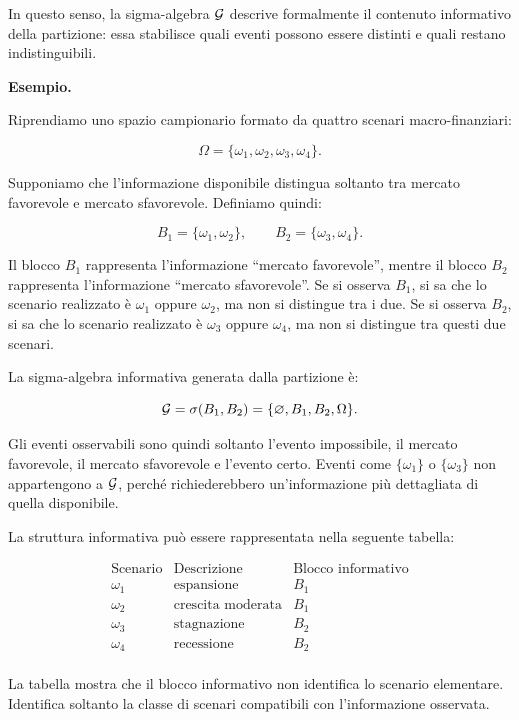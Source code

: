In questo senso, la sigma-algebra $\mathcal{G}$ descrive formalmente il contenuto informativo della partizione: essa stabilisce quali eventi possono essere distinti e quali restano indistinguibili.

\medskip

\noindent
\textbf{Esempio.}

Riprendiamo uno spazio campionario formato da quattro scenari macro-finanziari:

\[
\Omega
=
\{\omega_1,\omega_2,\omega_3,\omega_4\}.
\]

Supponiamo che l'informazione disponibile distingua soltanto tra mercato favorevole e mercato sfavorevole. Definiamo quindi:

\[
B_1
=
\{\omega_1,\omega_2\},
\qquad
B_2
=
\{\omega_3,\omega_4\}.
\]

Il blocco $B_1$ rappresenta l'informazione ``mercato favorevole'', mentre il blocco $B_2$ rappresenta l'informazione ``mercato sfavorevole''. Se si osserva $B_1$, si sa che lo scenario realizzato \`{e} $\omega_1$ oppure $\omega_2$, ma non si distingue tra i due. Se si osserva $B_2$, si sa che lo scenario realizzato \`{e} $\omega_3$ oppure $\omega_4$, ma non si distingue tra questi due scenari.

La sigma-algebra informativa generata dalla partizione \`{e}:

\[
\mathcal{G}
=
\sigma(B_1,B_2)
=
\{\varnothing,B_1,B_2,\Omega\}.
\]

Gli eventi osservabili sono quindi soltanto l'evento impossibile, il mercato favorevole, il mercato sfavorevole e l'evento certo. Eventi come $\{\omega_1\}$ o $\{\omega_3\}$ non appartengono a $\mathcal{G}$, perch\'{e} richiederebbero un'informazione pi\`{u} dettagliata di quella disponibile.

La struttura informativa pu\`{o} essere rappresentata nella seguente tabella:

\[
\begin{array}{c|c|c}
\text{Scenario} & \text{Descrizione} & \text{Blocco informativo} \\
\hline
\omega_1 & \text{espansione} & B_1 \\
\omega_2 & \text{crescita moderata} & B_1 \\
\omega_3 & \text{stagnazione} & B_2 \\
\omega_4 & \text{recessione} & B_2 \\
\end{array}
\]

La tabella mostra che il blocco informativo non identifica lo scenario elementare. Identifica soltanto la classe di scenari compatibili con l'informazione osservata.


